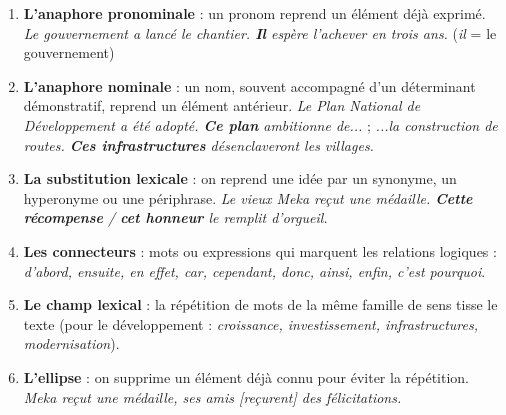 \documentclass[11pt]{article}
\begin{document}
\begin{enumerate}
\item \textbf{L'anaphore pronominale} : un pronom reprend un élément déjà exprimé. \emph{Le gouvernement a lancé le chantier. \textbf{Il} espère l'achever en trois ans.} (\emph{il} = le gouvernement)
\item \textbf{L'anaphore nominale} : un nom, souvent accompagné d'un déterminant démonstratif, reprend un élément antérieur. \emph{Le Plan National de Développement a été adopté. \textbf{Ce plan} ambitionne de...} ; \emph{...la construction de routes. \textbf{Ces infrastructures} désenclaveront les villages.}
\item \textbf{La substitution lexicale} : on reprend une idée par un synonyme, un hyperonyme ou une périphrase. \emph{Le vieux Meka reçut une médaille. \textbf{Cette récompense} / \textbf{cet honneur} le remplit d'orgueil.}
\item \textbf{Les connecteurs} : mots ou expressions qui marquent les relations logiques : \emph{d'abord, ensuite, en effet, car, cependant, donc, ainsi, enfin, c'est pourquoi}.
\item \textbf{Le champ lexical} : la répétition de mots de la même famille de sens tisse le texte (pour le développement : \emph{croissance, investissement, infrastructures, modernisation}).
\item \textbf{L'ellipse} : on supprime un élément déjà connu pour éviter la répétition. \emph{Meka reçut une médaille, ses amis [reçurent] des félicitations.}
\end{enumerate}
\end{document}
